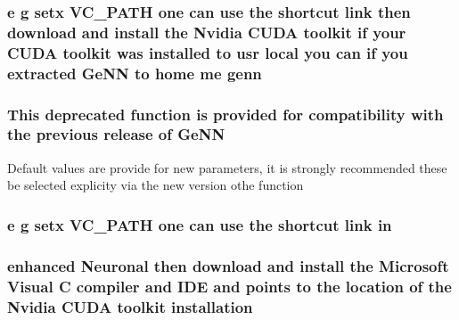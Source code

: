 \hypertarget{README_8txt_ad901b58517668ecb7d9abc2ae15010dc}{
\subsubsection[{genn}]{\setlength{\rightskip}{0pt plus 5cm}e g setx V\+C\+\_\+\+P\+A\+T\+H one can {\bf use} the shortcut link then download and install the Nvidia C\+U\+D\+A toolkit if your C\+U\+D\+A toolkit was installed {\bf to} usr local you can if you extracted {\bf Ge\+N\+N} {\bf to} home me genn}}\label{README_8txt_ad901b58517668ecb7d9abc2ae15010dc}
\hypertarget{README_8txt_a431a8d9aae97c72793fee7c3edd68559}{
\subsubsection[{Ge\+N\+N}]{\setlength{\rightskip}{0pt plus 5cm}This deprecated function {\bf is} provided for compatibility {\bf with} the previous release of Ge\+N\+N}}\label{README_8txt_a431a8d9aae97c72793fee7c3edd68559}
Default values are provide for new parameters, it is strongly recommended these be selected explicity via the new version othe function \hypertarget{README_8txt_a148897a6b2cc9cff25af80abb13426b0}{
\subsubsection[{in}]{\setlength{\rightskip}{0pt plus 5cm}e g setx V\+C\+\_\+\+P\+A\+T\+H one can {\bf use} the shortcut link in}}\label{README_8txt_a148897a6b2cc9cff25af80abb13426b0}
\hypertarget{README_8txt_a7de61c69397952ab48b198ee4fe495bc}{
\subsubsection[{installation}]{ enhanced Neuronal then download and install the Microsoft Visual {\bf C} compiler and I\+D\+E and points {\bf to} the location of the Nvidia C\+U\+D\+A toolkit installation}}\label{README_8txt_a7de61c69397952ab48b198ee4fe495bc}
